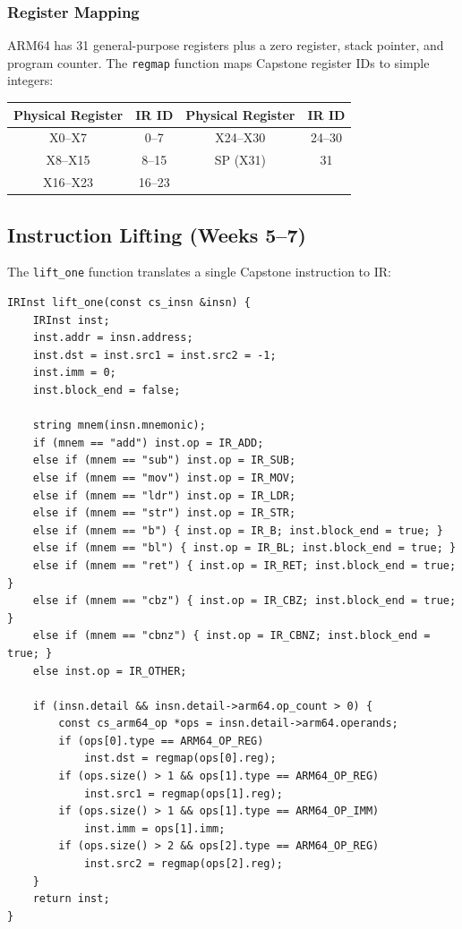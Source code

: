 \documentclass[12pt,a4paper]{article}
\begin{document}
\subsubsection{Register Mapping}

ARM64 has 31 general-purpose registers plus a zero register, stack pointer, and program counter. The \texttt{regmap} function maps Capstone register IDs to simple integers:

\begin{center}
\begin{tabular}{|c|c|c|c|}
\hline
\textbf{Physical Register} & \textbf{IR ID} & \textbf{Physical Register} & \textbf{IR ID} \\
\hline
X0--X7 & 0--7 & X24--X30 & 24--30 \\
X8--X15 & 8--15 & SP (X31) & 31 \\
X16--X23 & 16--23 & & \\
\hline
\end{tabular}
\end{center}

\subsection{Instruction Lifting (Weeks 5--7)}

The \texttt{lift\_one} function translates a single Capstone instruction to IR:

\begin{lstlisting}
IRInst lift_one(const cs_insn &insn) {
    IRInst inst;
    inst.addr = insn.address;
    inst.dst = inst.src1 = inst.src2 = -1;
    inst.imm = 0;
    inst.block_end = false;

    string mnem(insn.mnemonic);
    if (mnem == "add") inst.op = IR_ADD;
    else if (mnem == "sub") inst.op = IR_SUB;
    else if (mnem == "mov") inst.op = IR_MOV;
    else if (mnem == "ldr") inst.op = IR_LDR;
    else if (mnem == "str") inst.op = IR_STR;
    else if (mnem == "b") { inst.op = IR_B; inst.block_end = true; }
    else if (mnem == "bl") { inst.op = IR_BL; inst.block_end = true; }
    else if (mnem == "ret") { inst.op = IR_RET; inst.block_end = true; }
    else if (mnem == "cbz") { inst.op = IR_CBZ; inst.block_end = true; }
    else if (mnem == "cbnz") { inst.op = IR_CBNZ; inst.block_end = true; }
    else inst.op = IR_OTHER;

    if (insn.detail && insn.detail->arm64.op_count > 0) {
        const cs_arm64_op *ops = insn.detail->arm64.operands;
        if (ops[0].type == ARM64_OP_REG)
            inst.dst = regmap(ops[0].reg);
        if (ops.size() > 1 && ops[1].type == ARM64_OP_REG)
            inst.src1 = regmap(ops[1].reg);
        if (ops.size() > 1 && ops[1].type == ARM64_OP_IMM)
            inst.imm = ops[1].imm;
        if (ops.size() > 2 && ops[2].type == ARM64_OP_REG)
            inst.src2 = regmap(ops[2].reg);
    }
    return inst;
}
\end{lstlisting}
\end{document}
